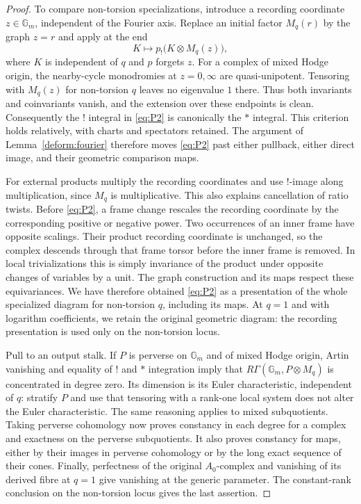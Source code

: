\begin{proof}
To compare non-torsion specializations, introduce a recording coordinate
$z\in\mathbb G_m$, independent of the Fourier axis.  Replace an
initial factor $M_q(r)$ by the graph
$z=r$ and apply at the end
\begin{equation}\label{eq:P2}
                K\longmapsto p_!\bigl(K\otimes M_q(z)\bigr),
\end{equation}
where $K$ is independent of $q$ and $p$ forgets $z$.
For a complex of mixed Hodge origin, the nearby-cycle monodromies
at $z=0,\infty$ are quasi-unipotent.  Tensoring with $M_q(z)$ for
non-torsion $q$ leaves no eigenvalue $1$ there.  Thus both invariants
and coinvariants vanish, and the extension over these endpoints is
clean.  Consequently the $!$ integral in \eqref{eq:P2} is canonically
the $*$ integral.  This criterion holds relatively, with charts and
spectators retained.  The argument of Lemma~\ref{deform:fourier}
therefore moves \eqref{eq:P2} past either pullback, either direct
image, and their geometric comparison maps.

For external products multiply the recording coordinates and use
$!$-image along multiplication, since $M_q$ is multiplicative.  This
also explains cancellation of ratio twists.  Before
\eqref{eq:P2}, a frame change rescales the recording coordinate by
the corresponding positive or negative power.  Two occurrences of
an inner frame have opposite scalings.  Their product recording
coordinate is unchanged, so the complex descends through that
frame torsor before the inner frame is removed.  In local
trivializations this is simply invariance of the product under
opposite changes of variables by a unit.  The graph construction
and its maps respect these equivariances.  We have therefore obtained
\eqref{eq:P2} as a presentation of the whole specialized diagram for
non-torsion $q$, including its maps.  At $q=1$ and with logarithm
coefficients, we retain the original geometric diagram: the recording
presentation is used only on the non-torsion locus.

Pull to an output stalk.  If $P$ is perverse on $\mathbb G_m$ and
of mixed Hodge origin, Artin vanishing and equality of $!$ and $*$
integration imply that
$R\Gamma(\mathbb G_m,P\otimes M_q)$ is concentrated in degree zero.
Its dimension is its Euler characteristic, independent of $q$:
stratify $P$ and use that tensoring with a rank-one local system
does not alter the Euler characteristic.  The same reasoning
applies to mixed subquotients.  Taking perverse cohomology now
proves constancy in each degree for a complex and exactness on the
perverse subquotients.  It also proves constancy for maps, either
by their images in perverse cohomology or by the long exact
sequence of their cones.  Finally, perfectness of the original
$A_0$-complex and vanishing of its derived fibre at $q=1$ give
vanishing at the generic parameter.
The constant-rank conclusion on the non-torsion locus gives the
last assertion.
\end{proof}

